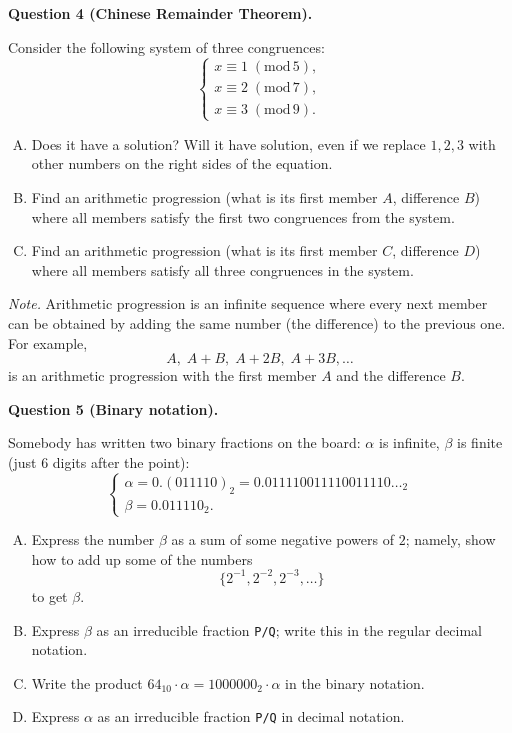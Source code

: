 \documentclass[jou]{apa6}
\begin{document}
\vspace{10pt}
{\bf Question 4 (Chinese Remainder Theorem).}

Consider the following system of three congruences:
$$\left\{ \begin{array}{l}
x \equiv 1\;(\text{mod}\,5),\\
x \equiv 2\;(\text{mod}\,7),\\
x \equiv 3\;(\text{mod}\,9).
\end{array} \right.$$

\begin{enumerate}[(A)]
\item Does it have a solution? Will it have solution, even if we replace $1,2,3$ with other numbers
on the right sides of the equation.
\item Find an arithmetic progression (what is its first member $A$, difference $B$) where all members satisfy
the first two congruences from the system.
\item Find an arithmetic progression (what is its first member $C$, difference $D$) where all members satisfy
all three congruences in the system.
\end{enumerate}

{\em Note.} Arithmetic progression is an infinite sequence where every next member can be obtained
by adding the same number (the difference) to the previous one. For example, 
$$A,\;A+B,\;A+2B,\;A+3B,\ldots$$
is an arithmetic progression with the first member $A$ and the difference $B$.


\vspace{10pt}
{\bf Question 5 (Binary notation).}

Somebody has written two binary fractions on the board: $\alpha$ is infinite, $\beta$ is finite (just $6$ digits
after the point): 
$$\left\{ \begin{array}{l}
\alpha = 0.(011110)_2 = 0.011110011110011110\ldots_2\\
\beta = 0.011110_2.
\end{array} \right.$$

\begin{enumerate}[(A)]
\item Express the number $\beta$ as a sum of some negative powers of $2$; 
namely, show how to add up some of the numbers
$$\{ 2^{-1}, 2^{-2}, 2^{-3}, \ldots \}$$ 
to get $\beta$. 
\item Express $\beta$ as an irreducible fraction {\tt P/Q}; write this in the regular decimal notation. 
\item Write the product $64_{10} \cdot \alpha = 1000000_2 \cdot \alpha$ in the binary notation. 
\item Express $\alpha$ as an irreducible fraction {\tt P/Q} in decimal notation.
\end{enumerate}
\end{document}
